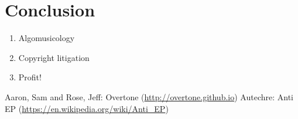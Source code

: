 \documentclass[numbers]{sigplanconf}
\begin{document}
\section{Conclusion}

\begin{enumerate}
    \item Algomusicology
    \item Copyright litigation
    \item Profit!
\end{enumerate}




\begin{thebibliography}{}
\softraggedright

 Aaron, Sam and Rose, Jeff: Overtone (\url{http://overtone.github.io})
 Autechre: Anti EP (\url{https://en.wikipedia.org/wiki/Anti_EP})

\end{thebibliography}
\end{document}
